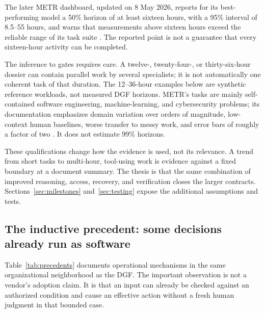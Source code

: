 The later METR dashboard, updated on 8 May 2026, reports for its best-performing model a 50\% horizon
of at least sixteen hours, with a 95\% interval of 8.5--55 hours, and warns that measurements above
sixteen hours exceed the reliable range of its task suite \citep{metr2026a}. The reported point is not
a guarantee that every sixteen-hour activity can be completed.

The inference to gates requires care. A twelve-, twenty-four-, or thirty-six-hour dossier can contain
parallel work by several specialists; it is not automatically one coherent task of that duration. The
12--36-hour examples below are synthetic reference workloads, not measured DGF horizons. METR's tasks
are mainly self-contained software engineering, machine-learning, and cybersecurity problems; its
documentation emphasizes domain variation over orders of magnitude, low-context human baselines, worse
transfer to messy work, and error bars of roughly a factor of two \citep{metr2026a,metr2026b}. It does
not estimate 99\% horizons.

These qualifications change how the evidence is used, not its relevance. A trend from short tasks to
multi-hour, tool-using work is evidence against a fixed boundary at a document summary. The thesis is
that the same combination of improved reasoning, access, recovery, and verification closes the larger
contracts. Sections~\ref{sec:milestones} and~\ref{sec:testing} expose the additional assumptions and
tests.

\subsection{The inductive precedent: some decisions already run as software}
\label{sec:precedents}

Table~\ref{tab:precedents} documents operational mechanisms in the same organizational neighborhood as
the DGF. The important observation is not a vendor's adoption claim. It is that an input can already be
checked against an authorized condition and cause an effective action without a fresh human judgment
in that bounded case.

